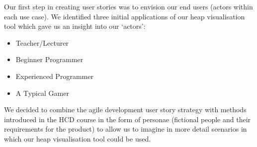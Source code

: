 \documentclass[10pt, a4paper]{article}
\begin{document}
Our first step in creating user stories was to envision our end users (actors within each use case). We identified three initial applications of our heap visualisation tool which gave us an insight into our ‘actors’:
\begin{itemize}

  \item Teacher/Lecturer
  \item Beginner Programmer
  \item Experienced Programmer 
  \item A Typical Gamer 

\end{itemize}
We decided to combine the agile development user story strategy with methods introduced in the HCD course in the form of personae (fictional people and their requirements for the product) to allow us to imagine in more detail scenarios in which our heap visualisation tool could be used.
\end{document}
